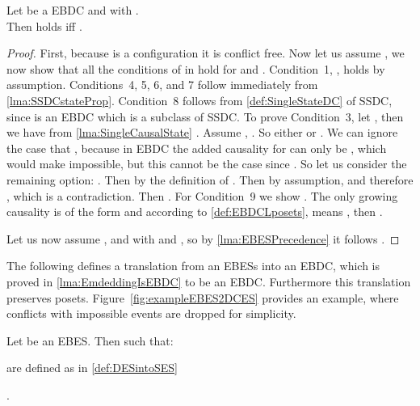 \documentclass[runningheads,a4paper]{llncs}
\begin{document}
\begin{theorem}
\label{thm:EBDCTrFromPosets}
Let  be a EBDC and 
with .\\
Then
 holds iff .
\end{theorem}

\begin{proof}
First, because  is a configuration it is conflict free. Now let us assume
, we
now show that all the conditions of  in \cite{dynamicCausality15} hold
for  and . Condition~1,
, holds by assumption. Conditions~4,
5, 6, and
7 follow immediately from \lem\ref{lma:SSDCstateProp}. Condition~8 follows from 
\ref{def:SingleStateDC} of SSDC, since  is an EBDC 
which is a subclass of SSDC. To prove Condition~3, let
, then we have from \lem\ref{lma:SingleCausalState}
. 
Assume , \ie . So either  or . We can ignore the case that , because in EBDC the added
causality for  can only be , which would make 
impossible, but this cannot be the case since .
So let us consider the remaining option: . Then  by the definition of . Then by assumption,  and
therefore , which is a contradiction. Then . For Condition~9 
we show . 
The only growing causality is of the form  and according to 
\ref{def:EBDCLposets},  means ,
then .

Let us now assume , and  with  and , so by \lem\ref{lma:EBESPrecedence} it follows .
\end{proof}

The following defines a translation from an EBESs into an EBDC, which
is proved in \lem\ref{lma:EmdeddingIsEBDC} to be an EBDC. Furthermore this
translation preserves posets.
Figure~\ref{fig:exampleEBES2DCES} provides an example, where conflicts with
impossible events are dropped for simplicity.

\begin{definition}
\label{def:EBES2DCES}
Let  be an EBES. Then 
  such that:
\begin{inparaenum}
	\item  are
defined as in \ref{def:DESintoSES}
	\item 
	\item \label{eq:EBES2DCESGrowing} .
\end{inparaenum}
\end{definition}
\end{document}
